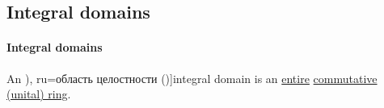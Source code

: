 \subsection{Integral domains}\label{subsec:integral_domains}

\paragraph{Integral domains}

\begin{definition}\label{def:integral_domain}
  An \term[bg=област на цялостност (\cite[def. V.4]{ГеновМиховскиМоллов1991}), ru=область целостности (\cite[def. 3.5.1]{Винберг2014})]{integral domain} is an \hyperref[def:entire_semiring]{entire} \hyperref[def:ring/commutative]{commutative (unital) ring}.
\end{definition}

